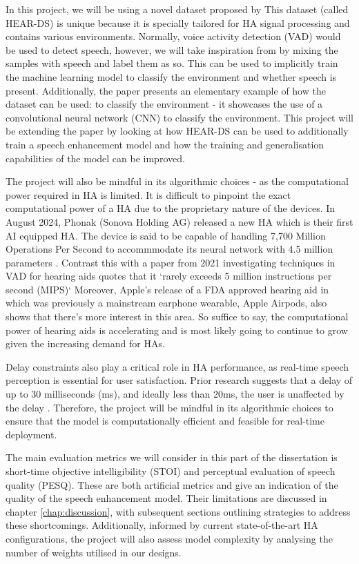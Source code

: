 \documentclass[logo,bsc,singlespacing,parskip,online]{infthesis}
\begin{document}
In this project, we will be using a novel dataset proposed by \citet{Huwel2020HearDS}
This dataset (called HEAR-DS) is unique because it is specially tailored for HA signal processing and contains
various environments. Normally, voice activity detection (VAD) would be 
used to detect speech, however, we will take inspiration from \citet{Huwel2020HearDS}
by mixing the samples with speech and label them as so. 
This can be used to implicitly train the machine learning model to classify the environment 
and whether speech is present. Additionally, the paper presents an 
elementary example of how the dataset can be used: to classify the environment -
it showcases the use of a convolutional neural network (CNN) to classify the environment.
This project will be extending the paper by looking at how HEAR-DS can be used 
to additionally train a speech enhancement model and how the training and 
generalisation capabilities of the model can be improved.

The project will also be mindful in its algorithmic choices - as the computational
power required in HA is limited. It is difficult to pinpoint the exact computational power of a HA
due to the proprietary nature of the devices. In August 2024,
Phonak (Sonova Holding AG) released a new HA which is their first AI 
equipped HA. The device is said to be capable of handling 7,700 Million 
Operations Per Second to accommmodate its neural network with 4.5 million parameters \cite{Hasemann2024PhonakSphere}.  Contrast this with a paper 
from 2021 investigating techniques in VAD for hearing aids 
quotes that it `rarely exceeds 5 million instructions per second (MIPS)` \cite{Gomez2021MIPS}
Moreover, Apple's release of a FDA approved hearing aid in which was previously a mainstream earphone wearable,
Apple Airpods, also shows that there's more interest in this area.
So suffice to say, the computational power of hearing aids is accelerating 
and is most likely going to continue to grow given the increasing demand 
for HAs.

Delay constraints also play a critical role in HA performance, as real-time speech perception is essential for user satisfaction.
Prior research suggests that a delay of up to 30 milliseconds (ms), and ideally less than 20ms, the user
is unaffected by the delay \cite{Stone2002Delays}. Therefore, the project will be mindful in its algorithmic choices to ensure that the model
is computationally efficient and feasible for real-time deployment.

The main evaluation metrics we will consider in this part of the dissertation 
is short-time objective intelligibility (STOI) and perceptual evaluation of speech quality (PESQ). 
These are both artificial metrics and give an indication of the quality of the speech enhancement model. 
Their limitations are discussed in chapter \ref{chap:discussion}, with subsequent sections outlining strategies to address these shortcomings.
Additionally, informed by current state-of-the-art HA configurations, the project will also assess model complexity by analysing the number of weights utilised in our designs.
\end{document}
